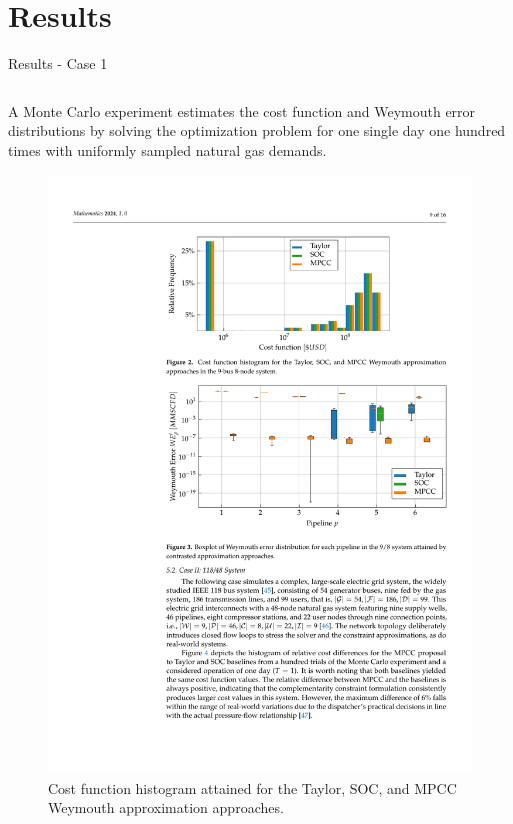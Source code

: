 \documentclass[hyperref={colorlinks,citecolor=blue,linkcolor=blue,urlcolor=blue}]{beamer}
\newlength\figureheight
\newlength\figurewidth
\begin{document}
\section{Results}
\begin{frame}{Results - Case 1}
\scriptsize
\begin{columns}[t,onlytextwidth]
    \begin{column}{0.48\textwidth}
        A Monte Carlo experiment estimates the cost function and Weymouth error distributions by solving the optimization problem for one single day one hundred times with uniformly sampled natural gas demands.
        
        \vspace{0.5em}
        \begin{figure}[H]
            \centering
            \setlength{}        
            \setlength{}
            \includegraphics[width=\figurewidth, height=\figureheight]{figures/case1_cost.pdf} %
            \caption{\scriptsize Cost function histogram attained for the Taylor, SOC, and MPCC Weymouth approximation approaches.}
            \label{fig:blue_test_cost}
        \end{figure}
    \end{column}
    

\end{columns}
\end{frame}
\end{document}
